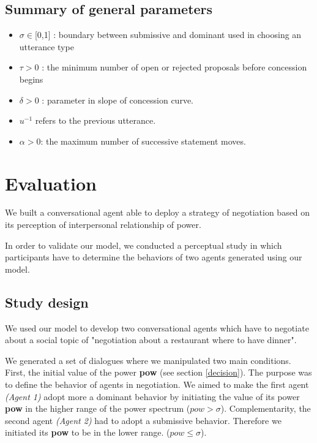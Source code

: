 \documentclass{llncs}
\begin{document}
	\subsection{Summary of general parameters }
	\begin{itemize}[noitemsep]
	
	\item $\sigma \in $[0,1] : boundary between submissive and dominant used in
	choosing an utterance type
	\item $\tau > 0$ : the minimum number of open or rejected proposals before concession begins
	\item $\delta > 0$ : parameter in slope of concession curve.
	\item $u^{-1}$ refers to the previous utterance.
	\item $\alpha> 0$: the maximum number of successive statement moves.
	
	
	\end{itemize}
	
	
	
	\section{Evaluation}
	
	We built a conversational agent able to deploy a strategy of negotiation based on its perception of interpersonal relationship of power. 
	
	In order to validate our model, we conducted a perceptual study in which participants have to determine the behaviors of two agents generated using our model. 
	
	\subsection{Study design}
	We used our model to develop two conversational agents which have to negotiate about a social topic of "negotiation about a restaurant where to have dinner".
	
	We generated a set of dialogues where we manipulated two main conditions. First, the initial value of the power \textbf{pow} (see section \ref{decision}). The purpose was to define the behavior of agents in negotiation.
	We aimed to make the first agent \emph{(Agent 1)} adopt more a dominant behavior by initiating the value of its power \textbf{pow} in the higher range of the power spectrum ($pow>\sigma$). Complementarity, the second agent \emph{(Agent 2)} had to adopt a submissive behavior. Therefore we initiated its \textbf{pow} to be in the lower range. ($ pow\leq \sigma$).
	
\end{document}
